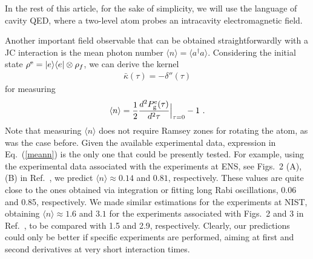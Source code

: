 \documentclass[pra,aps,twocolumn,showpacs]{revtex4}
\begin{document}
In the rest of this article, for the sake of simplicity, we will
use the language of cavity QED, where a two-level atom probes an
intracavity electromagnetic field.

Another important field observable that can be obtained
straightforwardly with a JC interaction is the mean photon number
$\langle n \rangle = \langle a^{\dagger} a \rangle$. Considering
the initial state $\rho^{\rm e} = | e \rangle \langle e | \otimes
\rho_f$, we can derive the kernel
\begin{eqnarray}
{\bar \kappa} (\tau) = - \delta''(\tau)
\end{eqnarray}
for measuring
\begin{equation}\label{meann}
\langle n \rangle = \frac{1}{2} \frac{d^{2}P_{\rm g}^{\rm e}
(\tau)}{d^{2}\tau} \Big|_{\tau=0} - 1 \,\, .
\end{equation}
Note that measuring $\langle n \rangle$ does not require Ramsey
zones for rotating the atom, as was the case before. Given the
available experimental data, expression in Eq.~(\ref{meann}) is
the only one that could be presently tested. For example, using
the experimental data associated with the experiments at ENS, see
Figs.~2 (A), (B) in Ref.~\cite{Brune}, we predict $\langle n
\rangle \approx 0.14$ and $0.81$, respectively. These values are
quite close to the ones obtained via integration or fitting long
Rabi oscillations, 0.06 and 0.85, respectively. We made similar
estimations for the experiments at NIST, obtaining $\langle n
\rangle \approx 1.6$ and $3.1$ for the experiments associated with
Figs.~2 and 3 in Ref.~\cite{Wineland}, to be compared with 1.5 and
2.9, respectively. Clearly, our predictions could only be better
if specific experiments are performed, aiming at first and second
derivatives at very short interaction times.
\end{document}
